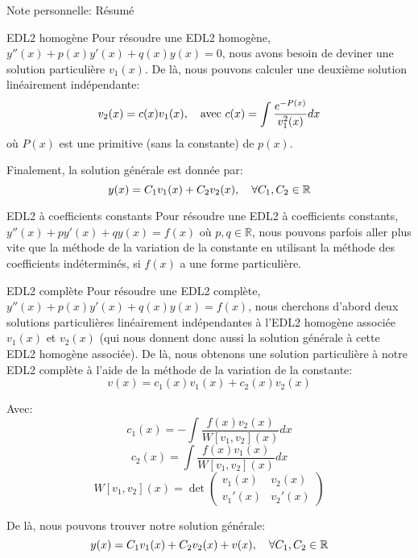 \documentclass[a4paper]{article}
\begin{document}
\begin{parag}{Note personnelle: Résumé}
    \begin{subparag}{EDL2 homogène}
        Pour résoudre une EDL2 homogène, $y''\left(x\right) + p\left(x\right)y'\left(x\right) + q\left(x\right)y\left(x\right) = 0$, nous avons besoin de deviner une solution particulière $v_1\left(x\right)$. De là, nous pouvons calculer une deuxième solution linéairement indépendante:
        \[v_2\left(x\right) = c\left(x\right) v_1\left(x\right), \mathspace \text{avec } c\left(x\right) = \int \frac{e^{-P\left(x\right)}}{v_1^2\left(x\right)}dx\]
        où $P\left(x\right)$ est une primitive (sans la constante) de $p\left(x\right)$.

        Finalement, la solution générale est donnée par:
        \[y\left(x\right) = C_1 v_1\left(x\right) + C_2 v_2\left(x\right), \mathspace \forall C_1, C_2 \in \mathbb{R}\]
    \end{subparag}

    \begin{subparag}{EDL2 à coefficients constants}
        Pour résoudre une EDL2 à coefficients constants, $y''\left(x\right) + py'\left(x\right) + qy\left(x\right) = f\left(x\right)$ où $p, q \in \mathbb{R}$, nous pouvons parfois aller plus vite que la méthode de la variation de la constante en utilisant la méthode des coefficients indéterminés, si $f\left(x\right)$ a une forme particulière.
    \end{subparag}

    \begin{subparag}{EDL2 complète}
        Pour résoudre une EDL2 complète, $y''\left(x\right) + p\left(x\right)y'\left(x\right) + q\left(x\right)y\left(x\right) = f\left(x\right)$, nous cherchons d'abord deux solutions particulières linéairement indépendantes à l'EDL2 homogène associée $v_1\left(x\right)$ et $v_2\left(x\right)$ (qui nous donnent donc aussi la solution générale à cette EDL2 homogène associée). De là, nous obtenons une solution particulière à notre EDL2 complète à l'aide de la méthode de la variation de la constante:
        \[v\left(x\right) = c_1\left(x\right) v_1\left(x\right) + c_2\left(x\right) v_2\left(x\right)\]

        Avec:
        \[c_1\left(x\right) = - \int \frac{f\left(x\right)v_2\left(x\right)}{W\left[v_1, v_2\right]\left(x\right)}dx\]
        \[c_2\left(x\right) = \int \frac{f\left(x\right) v_1\left(x\right)}{W\left[v_1, v_2\right]\left(x\right)}dx\]
        \[W\left[v_1, v_2\right]\left(x\right) = \det\begin{pmatrix} v_1\left(x\right) & v_2\left(x\right) \\ v_1'\left(x\right) & v_2'\left(x\right) \end{pmatrix} \]

        De là, nous pouvons trouver notre solution générale:
        \[y\left(x\right) = C_1 v_1\left(x\right) + C_2 v_2\left(x\right) + v\left(x\right), \mathspace \forall C_1, C_2 \in\mathbb{R}\]
    \end{subparag}
\end{parag}
\end{document}
